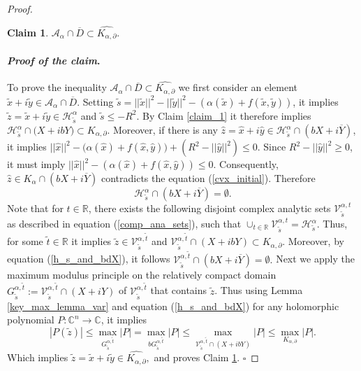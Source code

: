 \documentclass[12pt,reqno, a4paper]{amsart}
\newtheorem{claim}[theorem]{Claim}
\theoremstyle{definition}
\newenvironment{claimproof}{\paragraph{\textit{Proof of the claim}.}}{\hfill$\square$}
\theoremstyle{definition}
\numberwithin{equation}{section}
\def\R{\mathbb{R}}                              %
\def\C{\mathbb{C}}                              %
\begin{document}
\begin{proof}
\begin{claim}\label{claim_3}
$\mathcal{A}_{\alpha} \cap \overline{D} \subset \widehat{K_{\alpha,\partial}}.$
\end{claim}
\begin{claimproof}
	To prove the inequality $\mathcal{A}_{\alpha} \cap \overline{D} \subset \widehat{K_{\alpha, \partial}}$ we first consider an element $\tilde{x}+i\tilde{y} \in \mathcal{A}_{\alpha} \cap \overline{D}$. Setting $\tilde{s}=||\tilde{x}||^2-||\tilde{y}||^2- (\alpha(\tilde{x})+f(\tilde{x},\tilde{y}))$, it implies $\tilde{z}=\tilde{x}+i\tilde{y}\in\mathcal{H}_{\tilde{s}}^{\alpha}$ and $\tilde{s}\leq -R^2.$ By Claim \ref{claim_1} it therefore implies ${\mathcal{H}_{\tilde{s}}^{\alpha}\cap \big(X+ibY\big)\subset K_{\alpha, \partial}.}$ 
	Moreover, if there is any $\hat{z}=\hat{x}+i\hat{y}\in \mathcal{H}_{\tilde{s}}^{\alpha} \cap (bX+i\overline{Y})$, it implies ${||\hat{x}||^2-\big(\alpha(\hat{x})+f(\hat{x},\hat{y})\big)+(R^2-||\hat{y}||^2)\leq 0.}$ Since $R^2-||\hat{y}||^2\geq 0$, it must imply $||\hat{x}||^2-(\alpha(\hat{x})+f(\hat{x},\hat{y}))\leq 0.$ Consequently, $\hat{z}\in K_{\alpha}\cap (bX+i\overline{Y})$ contradicts the equation (\ref{cvx_initial}). Therefore
	\begin{equation}\label{h_s_and_bdX}
	\mathcal{H}_{\tilde{s}}^{\alpha} \cap (bX+i\overline{Y})=\emptyset.
	\end{equation}
Note that for $t\in \R$, there exists the following disjoint complex analytic sets $\mathcal{V}_{\tilde{s}}^{\alpha,t}$ as described in equation (\ref{comp_ana_sets}), such that $\cup_{t\in \R}{}\mathcal{V}_{\tilde{s}}^{\alpha,t}=\mathcal{H}_{\tilde{s}}^{\alpha}.$  Thus, for some $\tilde{t}\in \R$ it implies $\tilde{z}\in \mathcal{{V}}_{\tilde{s}}^{\alpha,\tilde{t}}$ and $\mathcal{V}_{\tilde{s}}^{\alpha,\tilde{t}}\cap (X+ibY) \subset K_{\alpha, \partial}.$ Moreover, by equation (\ref{h_s_and_bdX}), it follows $\mathcal{V}_{\tilde{s}}^{\alpha,\tilde{t}} \cap (bX+i\overline{Y})=\emptyset.$ Next we apply the maximum modulus principle on the relatively compact domain  $G_{\tilde{s}}^{\alpha,\tilde{t}}:=\mathcal{V}_{\tilde{s}}^{\alpha,\tilde{t}}\cap (X+iY)$ of $\mathcal{V}_{\tilde{s}}^{\alpha,\tilde{t}}$ that contains $\tilde{z}$. Thus using Lemma \ref{key_max_lemma_var} and equation (\ref{h_s_and_bdX}) for any holomorphic polynomial $P:\C^n \to \C$, it implies 
	$$|P(\tilde{z})|\leq \max_{G_{\tilde{s}}^{\alpha,\tilde{t}}}|P|=\max_{bG_{\tilde{s}}^{\alpha,\tilde{t}}}|P|\leq \max_{\mathcal{V}_{\tilde{s}}^{\alpha,\tilde{t}}\cap (X+ibY)}|P|\leq \max_{{K_{\alpha, \partial}}} |P|.$$
	Which implies $\tilde{z}=\tilde{x}+i\tilde{y}\in \widehat{K_{\alpha,\partial}},$ and proves Claim \ref{claim_3}.
\end{claimproof}


\end{proof}
\end{document}

